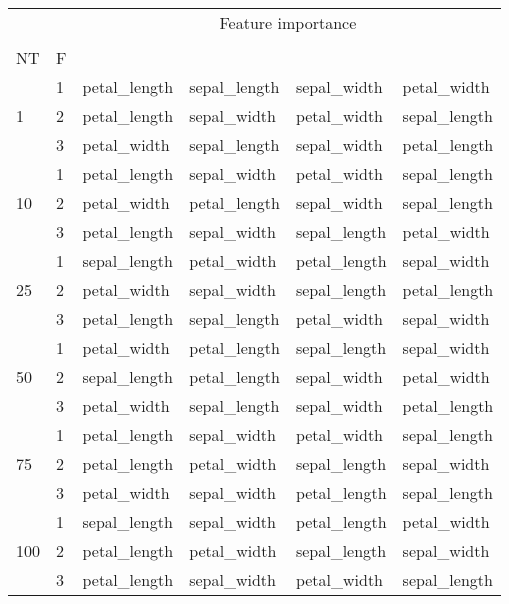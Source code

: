 \begin{table}[htbp]
\centering
\label{iris-features}
\begin{tabular}{llllll}
\toprule
 &  & \multicolumn{4}{c}{Feature importance} \\
 &  & #1 & #2 & #3 & #4 \\
NT & F &  &  &  &  \\
\midrule
\multirow[c]{3}{*}{1} & 1 & petal_length & sepal_length & sepal_width & petal_width \\
 & 2 & petal_length & sepal_width & petal_width & sepal_length \\
 & 3 & petal_width & sepal_length & sepal_width & petal_length \\
\multirow[c]{3}{*}{10} & 1 & petal_length & sepal_width & petal_width & sepal_length \\
 & 2 & petal_width & petal_length & sepal_width & sepal_length \\
 & 3 & petal_length & sepal_width & sepal_length & petal_width \\
\multirow[c]{3}{*}{25} & 1 & sepal_length & petal_width & petal_length & sepal_width \\
 & 2 & petal_width & sepal_width & sepal_length & petal_length \\
 & 3 & petal_length & sepal_length & petal_width & sepal_width \\
\multirow[c]{3}{*}{50} & 1 & petal_width & petal_length & sepal_length & sepal_width \\
 & 2 & sepal_length & petal_length & sepal_width & petal_width \\
 & 3 & petal_width & sepal_length & sepal_width & petal_length \\
\multirow[c]{3}{*}{75} & 1 & petal_length & sepal_width & petal_width & sepal_length \\
 & 2 & petal_length & petal_width & sepal_length & sepal_width \\
 & 3 & petal_width & sepal_width & petal_length & sepal_length \\
\multirow[c]{3}{*}{100} & 1 & sepal_length & sepal_width & petal_length & petal_width \\
 & 2 & petal_length & petal_width & sepal_length & sepal_width \\
 & 3 & petal_length & sepal_width & petal_width & sepal_length \\
\bottomrule
\end{tabular}
\end{table}
